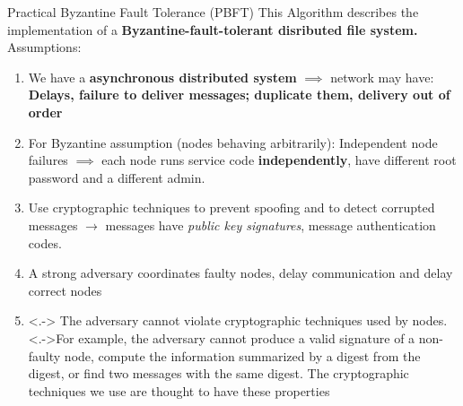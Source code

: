 \documentclass[../document.tex]{subfiles}
\begin{document}
\begin{frame}{Practical Byzantine Fault Tolerance (PBFT)}
This Algorithm describes the implementation of a \textbf{Byzantine-fault-tolerant disributed file system.}\\
Assumptions:\\
\begin{enumerate}
	\footnotesize
	\item <+-> We have a \textbf{asynchronous distributed system} $\implies$ network may have: \textbf{Delays, failure to deliver messages; duplicate them, delivery out of order}
	\item<+-> For Byzantine assumption (nodes behaving arbitrarily): Independent node failures $\implies$ each node runs service code \textbf{independently}, have different root password and a different admin.
	\item<+-> Use cryptographic techniques to prevent spoofing and to detect corrupted messages $\rightarrow$ messages have \textit{public key signatures}, message authentication codes.
	 \item<+-> A strong adversary coordinates faulty nodes, delay communication and delay correct nodes
	 \item<.-> The adversary cannot violate cryptographic techniques used by nodes. \note<.->{For example, the adversary cannot produce a valid signature of a non-faulty node, compute the information summarized by a digest from the digest, or ﬁnd two messages with the same digest. The cryptographic techniques we use are thought to have these properties}
\end{enumerate}

\end{frame}

\end{document}
